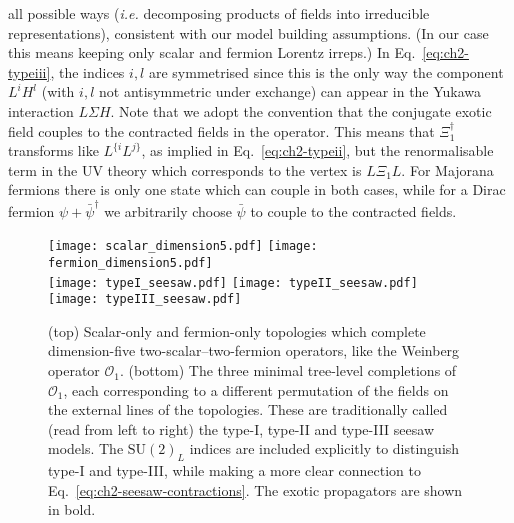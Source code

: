 all possible ways (\textit{i.e.} decomposing products of fields into irreducible
representations), consistent with our model building assumptions. (In our case
this means keeping only scalar and fermion Lorentz irreps.) In
Eq.~\eqref{eq:ch2-typeiii}, the indices $i,l$ are symmetrised since this is the only
way the component $L^{i}H^{l}$ (with $i,l$ not antisymmetric under exchange) can
appear in the Yukawa interaction $L \Sigma H$. Note that we adopt the convention
that the conjugate exotic field couples to the contracted fields in the
operator. This means that $\Xi_{1}^{\dagger}$ transforms like $L^{\{i} L^{j\}}$,
as implied in Eq.~\eqref{eq:ch2-typeii}, but the renormalisable term in the UV
theory which corresponds to the vertex is $L\Xi_{1}L$. For Majorana fermions
there is only one state which can couple in both cases, while for a Dirac
fermion $\psi + \bar{\psi}^{\dagger}$ we arbitrarily choose $\bar{\psi}$ to
couple to the contracted fields.

\begin{figure}[t]
  \centering
  \texttt{[image: scalar\_dimension5.pdf]}
  \texttt{[image: fermion\_dimension5.pdf]}\\
  \texttt{[image: typeI\_seesaw.pdf]}
  \texttt{[image: typeII\_seesaw.pdf]}
  \texttt{[image: typeIII\_seesaw.pdf]}
  \caption[(top) Scalar-only and fermion-only topologies which complete
  dimension-five two-scalar--two-fermion operators, like the Weinberg operator
  $\mathcal{O}_{1}$. (bottom) The three minimal tree-level completions of
  $\mathcal{O}_{1}$, each corresponding to a different permutation of the fields
  on the external lines of the topologies.]{(top) Scalar-only and fermion-only
    topologies which complete dimension-five two-scalar--two-fermion operators,
    like the Weinberg operator $\mathcal{O}_{1}$. (bottom) The three minimal
    tree-level completions of $\mathcal{O}_{1}$, each corresponding to a
    different permutation of the fields on the external lines of the topologies.
    These are traditionally called (read from left to right) the type-I, type-II
    and type-III seesaw models. The $\mathrm{SU}(2)_{L}$ indices are included
    explicitly to distinguish type-I and type-III, while making a more clear
    connection to Eq.~\eqref{eq:ch2-seesaw-contractions}. The exotic propagators
    are shown in bold.}
  \label{fig:ch2-seesaw-figs}
\end{figure}

